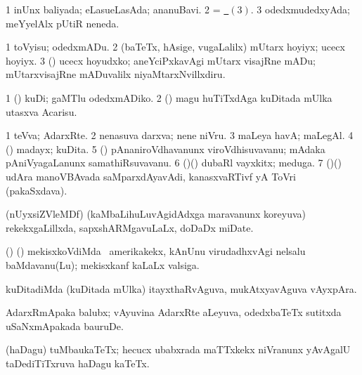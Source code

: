 {{{{{{\noindent 
\gl{\pagu}
\expl{}
\bmng
\bnum
\num{1}  inUnx baliyada; eLasueLasAda; ananuBavi. 
\num{2}  = \hyperlink{wet pagu3}{\pagu\ $(3)$}. 
\hypertarget{wet pagu3}{} 
\num{3}  odedxmudedxyAda; meYyelAlx pUtiR neneda. 
\enum
\emng
\eentry

\bentry
{} 
\gl{\sakirx}
\bmng
\bnum
\num{1} toVyisu; odedxmADu. 
\num{2} (baTeTx, hAsige, \mo vugaLalilx) mUtarx hoyiyx; ucecx hoyiyx. 
\num{3} (\AtAmx) ucecx hoyudxko; aneYciPxkavAgi mUtarx visajRne mADu; mUtarxvisajRne mADuvalilx niyaMtarxNvillxdiru. 
\enum
\emng

\noindent 
\gl{\pagu}
\expl{}
\bmng
\bnum
\num{1}  (\AmA) kuDi; gaMTlu odedxmADiko. 
\num{2}  (\ashi) magu huTiTxdAga kuDitada mUlka utasxva Acarisu. 
\enum
\emng
\eentry

\bentry
{} 
\gl{\nA}
\expl{}
\bmng
\bnum
\num{1} teVva; AdarxRte. 
\num{2} nenasuva darxva; nene niVru. 
\num{3} maLeya havA; maLegAl. 
\num{4} (\AmA) madayx; kuDita. 
\num{5} (\ame) pAnaniroVdhavanunx viroVdhisuvavanu; mAdaka pAniVyagaLanunx samathiRsuvavanu. 
\num{6} (\birx)(\AmA) dubaRl vayxkitx; meduga. 
\num{7} (\birx)(\rAshA) udAra manoVBAvada saMparxdAyavAdi, kanasxvaRTivf yA ToVri (pakaSxdava). 
\enum
\emng
\eentry

\bentry
{} 
\gl{\nA}
\expl{}
\bmng
(nUyxsiZVleMDf) (kaMbaLihuLuvAgidAdxga maravanunx koreyuva) rekekxgaLillxda, sapxshARMgavuLaLx, doDaDx miDate. 
\emng
\eentry

\bentry
{} 
\gl{\nA}
\expl{}
\bmng
(\ame) (\AmA) mekisxkoVdiMda \kanu\ amerikakekx, kAnUnu virudadhxvAgi nelsalu baMdavanu(Lu); mekisxkanf kaLaLx valsiga. 
\emng
\eentry

\bentry
{} 
\gl{\nA}
\expl{}
\bmng
kuDitadiMda (kuDitada mUlka) itayxthaRvAguva, mukAtxyavAguva vAyxpAra. 
\emng
\eentry

\bentry
{} 
\gl{\nA}
\expl{}
\bmng
AdarxRmApaka balubx; vAyuvina AdarxRte aLeyuva, odedxbaTeTx sutitxda uSaNxmApakada bauruDe. 
\emng
\eentry

\bentry
{} 
\gl{\nA}
\expl{}
\bmng
(haDagu) tuMbaukaTeTx; hecucx ubabxrada maTTxkekx niVranunx yAvAgalU taDediTiTxruva haDagu kaTeTx. 
\emng
\eentry

}}}}}}
